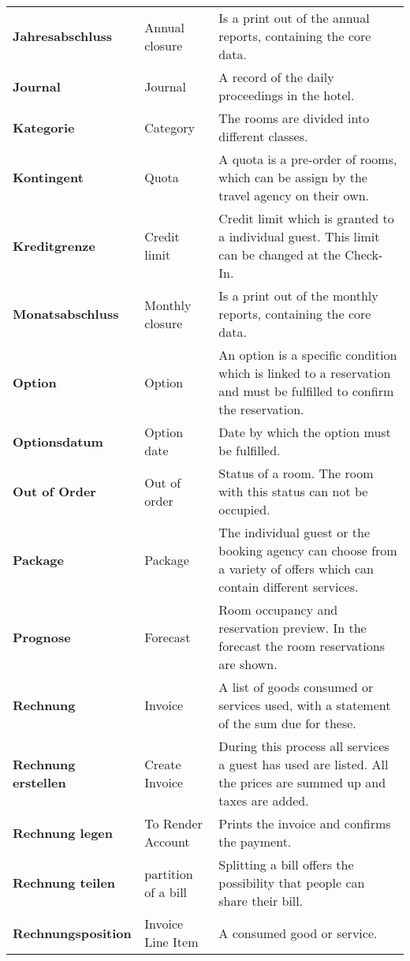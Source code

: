 \documentclass[../Pflichtenheft.tex]{subfiles}
\begin{document}
\begin{longtable}{p{4cm} p{4cm} p{6cm}}
		\textbf{Jahresabschluss} & {Annual closure} & Is a print out of the annual reports, containing the core data. \\[0.5cm]
		\textbf{Journal} & {Journal} & A record of the daily proceedings in the hotel. \\[0.5cm]
        \textbf{Kategorie} & {Category} & The rooms are divided into different classes. \\[0.5cm]
        \textbf{Kontingent} & {Quota} & A quota is a pre-order of rooms, which can be assign by the travel agency on their own. \\[0.5cm]
        \textbf{Kreditgrenze} & {Credit limit} & Credit limit which is granted to a individual guest. This limit can be changed at the Check-In. \\[0.5cm]
        \textbf{Monatsabschluss} & {Monthly closure} & Is a print out of the monthly reports, containing the core data. \\[0.5cm]
        \textbf{Option} & {Option} & An option is a specific condition which is linked to a reservation and must be fulfilled to confirm the reservation. \\[0.5cm]
        \textbf{Optionsdatum} & {Option date} & Date by which the option must be fulfilled. \\[0.5cm]
        \textbf{Out of Order} & {Out of order} & Status of a room. The room with this status can not be occupied. \\[0.5cm]
        \textbf{Package} & {Package} & The individual guest or the booking agency can choose from a variety of offers which can contain different services. \\[0.5cm]
        \textbf{Prognose} & {Forecast} & Room occupancy and reservation preview. In the forecast the room reservations are shown. \\[0.5cm]
        \textbf{Rechnung} & {Invoice} & A list of goods consumed or services used, with a statement of the sum due for these. \\[0.5cm]
        \textbf{Rechnung erstellen} & {Create Invoice} & During this process all services a guest has used are listed. All the prices are summed up and taxes are added. \\[0.5cm]
        \textbf{Rechnung legen} & {To Render Account} & Prints the invoice and confirms the payment. \\[0.5cm]
        \textbf{Rechnung teilen} & {partition of a bill} & Splitting a bill offers the possibility that people can share their bill. \\[0.5cm]
        \textbf{Rechnungsposition} & {Invoice Line Item} & A consumed good or service. \\[0.5cm]

\end{longtable}
\end{document}
